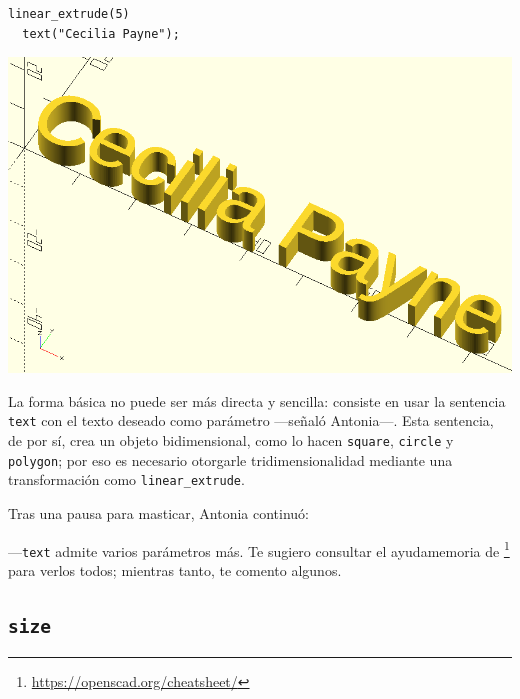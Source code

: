\begin{center}
\begin{minipage}[]{.55\textwidth}%
 \begin{lstlisting}
linear_extrude(5)
  text("Cecilia Payne");
\end{lstlisting}%
\end{minipage}\hfill
\begin{minipage}[]{.45\textwidth}%
  \centering
  \includegraphics[width=1\textwidth]{imagenes/cecilia-payne}
\end{minipage}
\end{center}

\guillemotright La forma básica no puede ser más directa y sencilla:
consiste en usar la sentencia \lstinline!text! con el texto deseado
como parámetro ---señaló Antonia---. Esta sentencia, de por sí, crea
un objeto bidimensional, como lo hacen \lstinline!square!,
\lstinline!circle! y \lstinline!polygon!; por eso es necesario
otorgarle tridimensionalidad mediante una transformación como
\lstinline!linear_extrude!.

Tras una pausa para masticar, Antonia continuó:

---\lstinline!text! admite varios parámetros más.  Te sugiero
consultar el ayudamemoria de
\openscad{}\footnote{\url{https://openscad.org/cheatsheet/}} para
verlos todos; mientras tanto, te comento algunos.

\subsection{\texttt{size}}

